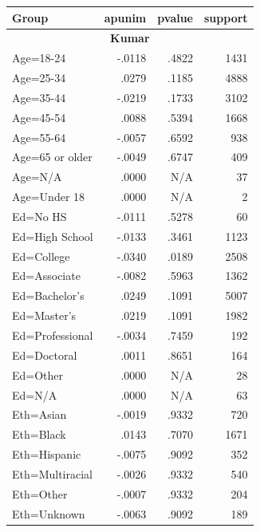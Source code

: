 \documentclass{article} %
\theoremstyle{definition}
\theoremstyle{plain}
\begin{document}
\begin{table}[t]
	\centering
	\scriptsize 
	\begin{tabularx}{\columnwidth}{X r r r}
		\toprule
		\textbf{Group} & \textbf{apunim} & \textbf{pvalue} & \textbf{support} \\
		\midrule
		
		\multicolumn{4}{c}{\textbf{Kumar}} \\
		\midrule
		\rowcolor{gray!15}
		Age=18-24 & -.0118 & .4822 & 1431 \\
		Age=25-34 & .0279 & .1185 & 4888 \\
		\rowcolor{gray!15}
		Age=35-44 & -.0219 & .1733 & 3102 \\
		Age=45-54 & .0088 & .5394 & 1668 \\
		\rowcolor{gray!15}
		Age=55-64 & -.0057 & .6592 & 938 \\
		\rowcolor{gray!15}
		Age=65 or older & -.0049 & .6747 & 409 \\
		Age=N/A & .0000 & N/A & 37 \\
		Age=Under 18 & .0000 & N/A & 2 \\
		\rowcolor{gray!15}
		Ed=No HS & -.0111 & .5278 & 60 \\
		\rowcolor{gray!15}
		Ed=High School & -.0133 & .3461 & 1123 \\
		Ed=College & -.0340 & .0189 & 2508 \\
		\rowcolor{gray!15}
		Ed=Associate & -.0082 & .5963 & 1362 \\
		Ed=Bachelor's & .0249 & .1091 & 5007 \\
		Ed=Master's & .0219 & .1091 & 1982 \\
		\rowcolor{gray!15}
		Ed=Professional & -.0034 & .7459 & 192 \\
		Ed=Doctoral & .0011 & .8651 & 164 \\
		Ed=Other & .0000 & N/A & 28 \\
		Ed=N/A & .0000 & N/A & 63 \\
		\rowcolor{gray!15}
		Eth=Asian & -.0019 & .9332 & 720 \\
		Eth=Black & .0143 & .7070 & 1671 \\
		\rowcolor{gray!15}
		Eth=Hispanic & -.0075 & .9092 & 352 \\
		\rowcolor{gray!15}
		Eth=Multiracial & -.0026 & .9332 & 540 \\
		\rowcolor{gray!15}
		Eth=Other & -.0007 & .9332 & 204 \\
		\rowcolor{gray!15}
		Eth=Unknown & -.0063 & .9092 & 189 \\

\end{tabularx}
\end{table}
\end{document}
